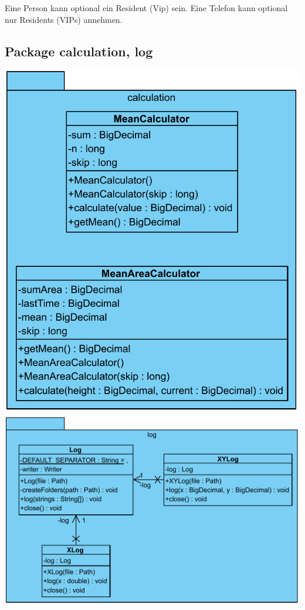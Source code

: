 Eine Person kann optional ein Resident (Vip) sein. Eine Telefon kann optional nur Residents (VIPs) annehmen.

\subsection{Package calculation, log}

\includegraphics[scale=0.5]{abbildungen/uml/calculation.pdf}
\includegraphics[scale=0.5]{abbildungen/uml/log.pdf}

